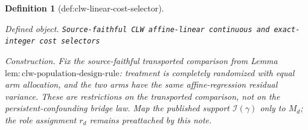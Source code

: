 \documentclass{article}
\newtheorem{definition}{Definition}
\begin{document}
\begin{definition}[def:clw-linear-cost-selector]\label{def:clw-linear-cost-selector}
\par\smallskip\noindent\emph{Defined object.} \texttt{Source-\allowbreak{}faithful CLW affine-\allowbreak{}linear continuous and exact-\allowbreak{}integer cost selectors}
\par\smallskip\noindent\emph{Construction.} Fix the source-faithful transported comparison from Lemma~\(\mathrm{lem{:}clw\text{-}population\text{-}design\text{-}rule}\): treatment is completely randomized with equal arm allocation, and the two arms have the same affine-regression residual variance.  These are restrictions on the transported comparison, not on the persistent-confounding bridge law.  Map the published support \(\mathcal I(\gamma)\) only to \(M_d\); the role assignment \(r_d\) remains preattached by this note.


\end{definition}
\end{document}
